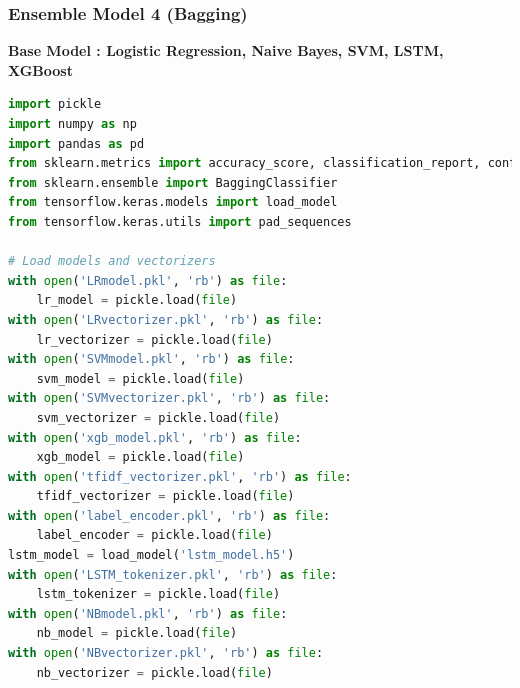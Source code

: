 \subsubsection{Ensemble Model 4 (Bagging)}

\noindent
\textbf{Base Model : Logistic Regression, Naive Bayes, SVM, LSTM, XGBoost}

\noindent
\begin{tcolorbox}[colback=gray!5!white, colframe=gray!80!black, boxrule=0.5pt, title=Evaluate Bagging Meta-Learner and Ensemble Model 4]
    \begin{lstlisting}[language=Python]
import pickle
import numpy as np
import pandas as pd
from sklearn.metrics import accuracy_score, classification_report, confusion_matrix
from sklearn.ensemble import BaggingClassifier
from tensorflow.keras.models import load_model
from tensorflow.keras.utils import pad_sequences

# Load models and vectorizers
with open('LRmodel.pkl', 'rb') as file:
    lr_model = pickle.load(file)
with open('LRvectorizer.pkl', 'rb') as file:
    lr_vectorizer = pickle.load(file)
with open('SVMmodel.pkl', 'rb') as file:
    svm_model = pickle.load(file)
with open('SVMvectorizer.pkl', 'rb') as file:
    svm_vectorizer = pickle.load(file)
with open('xgb_model.pkl', 'rb') as file:
    xgb_model = pickle.load(file)
with open('tfidf_vectorizer.pkl', 'rb') as file:
    tfidf_vectorizer = pickle.load(file)
with open('label_encoder.pkl', 'rb') as file:
    label_encoder = pickle.load(file)
lstm_model = load_model('lstm_model.h5')
with open('LSTM_tokenizer.pkl', 'rb') as file:
    lstm_tokenizer = pickle.load(file)
with open('NBmodel.pkl', 'rb') as file:
    nb_model = pickle.load(file)
with open('NBvectorizer.pkl', 'rb') as file:
    nb_vectorizer = pickle.load(file)
\end{lstlisting}
\end{tcolorbox}
